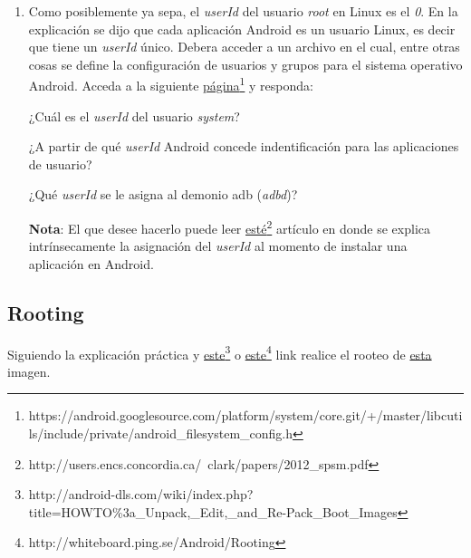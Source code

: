 \begin{itemize}
\begin{enumerate}
    \item Como posiblemente ya sepa, el \textit{userId} del usuario \textit{root} en Linux es el \emph{0}. En la explicación se dijo que cada aplicación Android es un usuario Linux, es decir que tiene un \textit{userId} único. Debera acceder a un archivo en el cual, entre otras cosas se define la configuración de usuarios y grupos para el sistema operativo Android. Acceda a la siguiente \href{https://android.googlesource.com/platform/system/core.git/+/master/libcutils/include/private/android\_filesystem\_config.h}{página}\footnote{https://android.googlesource.com/platform/system/core.git/+/master/libcutils/include/private/android\_filesystem\_config.h} y responda:
    \begin{questions}
        \question ¿Cuál es el \textit{userId} del usuario \emph{system}?
        
        \question ¿A partir de qué \textit{userId} Android concede indentificación para las aplicaciones de usuario?
        
        \question ¿Qué \textit{userId} se le asigna al demonio adb (\textit{adbd})?
    \end{questions}
    
    \textbf{Nota}: El que desee hacerlo puede leer \href{http://users.encs.concordia.ca/~clark/papers/2012\_spsm.pdf}{esté}\footnote{http://users.encs.concordia.ca/~clark/papers/2012\_spsm.pdf} artículo en donde se explica intrínsecamente la asignación del \textit{userId} al momento de instalar una aplicación en Android.
    \end{enumerate}
\end{itemize}

\subsection{Rooting}
\begin{questions}
  \question Siguiendo la explicación práctica y \href{http://android-dls.com/wiki/index.php?title=HOWTO%3a\_Unpack,\_Edit,\_and\_Re-Pack\_Boot\_Images}{este}\footnote{http://android-dls.com/wiki/index.php?title=HOWTO\%3a\_Unpack,\_Edit,\_and\_Re-Pack\_Boot\_Images} o \href{http://whiteboard.ping.se/Android/Rooting}{este}\footnote{http://whiteboard.ping.se/Android/Rooting} link realice el rooteo de \href{}{esta} imagen.
\end{questions}